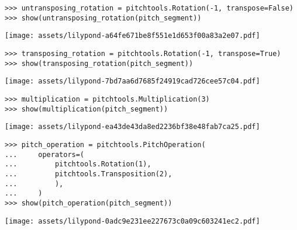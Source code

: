 \begin{comment}
<abjad>
untransposing_rotation = pitchtools.Rotation(-1, transpose=False)
show(untransposing_rotation(pitch_segment))
transposing_rotation = pitchtools.Rotation(-1, transpose=True)
show(transposing_rotation(pitch_segment))
</abjad>
\end{comment}

\begin{singlespacing}
\vspace{-0.5\baselineskip}
\begin{lstlisting}
>>> untransposing_rotation = pitchtools.Rotation(-1, transpose=False)
>>> show(untransposing_rotation(pitch_segment))
\end{lstlisting}
\noindent\texttt{[image: assets/lilypond-a64fe671be8f551e1d653f00a83a2e07.pdf]}
\begin{lstlisting}
>>> transposing_rotation = pitchtools.Rotation(-1, transpose=True)
>>> show(transposing_rotation(pitch_segment))
\end{lstlisting}
\noindent\texttt{[image: assets/lilypond-7bd7aa6d7685f24919cad726cee57c04.pdf]}
\end{singlespacing}

\begin{comment}
<abjad>
multiplication = pitchtools.Multiplication(3)
show(multiplication(pitch_segment))
</abjad>
\end{comment}

\begin{singlespacing}
\vspace{-0.5\baselineskip}
\begin{lstlisting}
>>> multiplication = pitchtools.Multiplication(3)
>>> show(multiplication(pitch_segment))
\end{lstlisting}
\noindent\texttt{[image: assets/lilypond-ea43de43da8ed2236bf38e48fab7ca25.pdf]}
\end{singlespacing}

\begin{comment}
<abjad>
pitch_operation = pitchtools.PitchOperation(
    operators=(
        pitchtools.Rotation(1),
        pitchtools.Transposition(2),
        ),
    )
show(pitch_operation(pitch_segment))
</abjad>
\end{comment}

\begin{singlespacing}
\vspace{-0.5\baselineskip}
\begin{lstlisting}
>>> pitch_operation = pitchtools.PitchOperation(
...     operators=(
...         pitchtools.Rotation(1),
...         pitchtools.Transposition(2),
...         ),
...     )
>>> show(pitch_operation(pitch_segment))
\end{lstlisting}
\noindent\texttt{[image: assets/lilypond-0adc9e231ee227673c0a09c603241ec2.pdf]}
\end{singlespacing}

